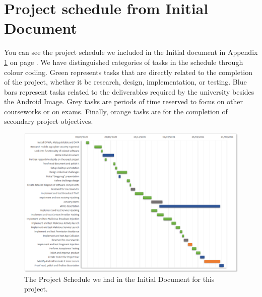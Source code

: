 
\chapter{Project schedule from Initial Document}
\label{app:project_schedule}

    You can see the project schedule we included in the Initial document in Appendix \ref{app:project_schedule} on page \pageref{app:project_schedule}. We have distinguished categories of tasks in the schedule through colour coding. Green represents tasks that are directly related to the completion of the project, whether it be research, design, implementation, or testing. Blue bars represent tasks related to the deliverables required by the university besides the Android Image. Grey tasks are periods of time reserved to focus on other courseworks or on exams. Finally, orange tasks are for the completion of secondary project objectives.
    
    \begin{landscape}
    \begin{figure}[H]
    	\centering
    	\includegraphics[width=1\linewidth]{./graphics/schedule.PNG}
    	
    	\caption[Project schedule.]{The Project Schedule we had in the Initial Document for this project.}
    	
    	\label{fig:schedule}
    \end{figure}
    \end{landscape}

